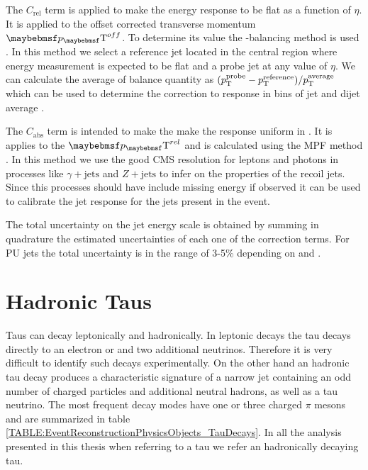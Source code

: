 The $C_{\text{rel}}$ term is applied to make the energy response to be flat as a function of $\eta$. It is applied to the offset corrected transverse momentum $\pT^{off}$. To determine its value the \pt-balancing method is used \cite{ARTICLE:CMSDeterminationJetEnergyCalibration}. In this method we select a reference jet located in the central region where energy measurement is expected to be flat and a probe jet at any value of $\eta$. We can calculate the average of balance quantity as $(p_{\mathrm{T}}^{\text{probe}} - p_{\mathrm{T}}^{\text{reference}} ) / p_{\mathrm{T}}^{\text{average}}$ which can be used to determine the correction to response in bins of jet \eta and dijet average \pt. 

The $C_{\text{abs}}$ term is intended to make the make the response uniform in \pt. It is applies to the $\pT^{rel}$ and is calculated using the \gls{MPF} method \cite{ARTICLE:CDFDijetAngularDistribution}. In this method we use the good \gls{CMS} resolution for leptons and photons in processes like $\gamma + \text{jets}$ and $Z + \text{jets}$ to infer on the properties of the recoil jets. Since this processes should have include missing energy if observed it can be used to calibrate the jet response for the jets present in the event.

The total uncertainty on the jet energy scale is obtained by summing in quadrature the estimated uncertainties of each one of the correction terms. For \gls{PU} jets the total uncertainty is in the range of 3-5\% depending on \pt and \eta \cite{ARTICLE:CMSDeterminationJetEnergyCalibration}.


\section{Hadronic Taus}
\label{SECTION:EventReconstructionPhysicsObjects_Taus}


Taus can decay leptonically and hadronically. In leptonic decays the tau decays directly to an electron or and two additional neutrinos. Therefore it is very difficult to identify such decays experimentally. On the other hand an hadronic tau decay produces a characteristic signature of a narrow jet containing an odd number of charged particles and additional neutral hadrons, as well as a tau neutrino. The most frequent decay modes have one or three charged $\pi$ mesons and are summarized in table \ref{TABLE:EventReconstructionPhysicsObjects_TauDecays}. In all the analysis presented in this thesis when referring to a tau we refer an hadronically decaying tau.

